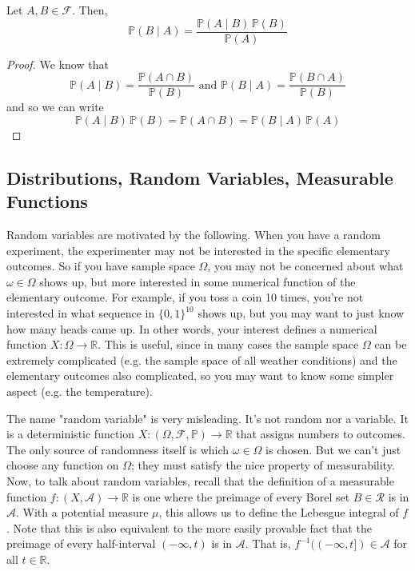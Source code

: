 \documentclass{article}
\begin{document}
      \begin{theorem}
        Let $A, B \in \mathcal{F}$. Then, 
        \begin{equation}
          \mathbb{P}(B \mid A) = \frac{\mathbb{P}(A \mid B) \, \mathbb{P}(B)}{\mathbb{P}(A)}
        \end{equation}
      \end{theorem}
      \begin{proof}
        We know that 
        \begin{equation}
          \mathbb{P}(A \mid B) = \frac{\mathbb{P} (A \cap B)}{\mathbb{P}(B)} \text{ and } \mathbb{P}(B \mid A) = \frac{\mathbb{P}(B \cap A)}{\mathbb{P}(B)}
        \end{equation}
        and so we can write 
        \begin{equation}
          \mathbb{P} (A \mid B) \, \mathbb{P}(B) = \mathbb{P}(A \cap B) = \mathbb{P}(B \mid A) \, \mathbb{P}(A)
        \end{equation}
      \end{proof}

  \subsection{Distributions, Random Variables, Measurable Functions}

    Random variables are motivated by the following. When you have a random experiment, the experimenter may not be interested in the specific elementary outcomes. So if you have sample space $\Omega$, you may not be concerned about what $\omega \in \Omega$ shows up, but more interested in some numerical function of the elementary outcome. For example, if you toss a coin 10 times, you're not interested in what sequence in $\{0, 1\}^{10}$ shows up, but you may want to just know how many heads came up. In other words, your interest defines a numerical function $X: \Omega \rightarrow \mathbb{R}$. This is useful, since in many cases the sample space $\Omega$ can be extremely complicated (e.g. the sample space of all weather conditions) and the elementary outcomes also complicated, so you may want to know some simpler aspect (e.g. the temperature). 

    The name "random variable" is very misleading. It's not random nor a variable. It is a deterministic function $X: (\Omega, \mathcal{F}, \mathbb{P}) \longrightarrow \mathbb{R}$ that assigns numbers to outcomes. The only source of randomness itself is which $\omega \in \Omega$ is chosen. But we can't just choose any function on $\Omega$; they must satisfy the nice property of measurability. Now, to talk about random variables, recall that the definition of a measurable function $f: (X, \mathcal{A}) \longrightarrow \mathbb{R}$ is one where the preimage of every Borel set $B \in \mathcal{R}$ is in $\mathcal{A}$. With a potential measure $\mu$, this allows us to define the Lebesgue integral of $f$. Note that this is also equivalent to the more easily provable fact that the preimage of every half-interval $(-\infty, t)$ is in $\mathcal{A}$. That is, $f^{-1}((-\infty, t]) \in \mathcal{A}$ for all $t \in \mathbb{R}$. 
\end{document}
